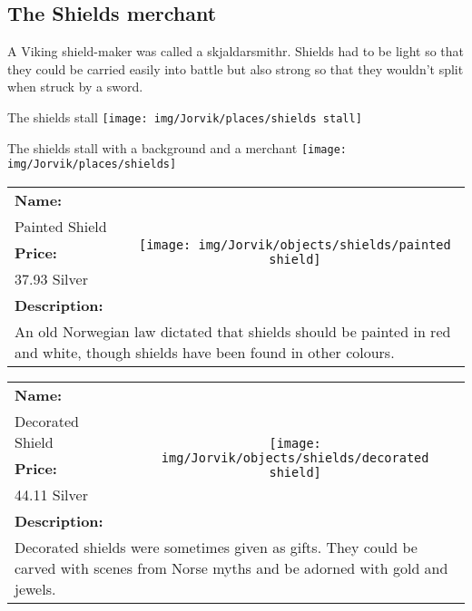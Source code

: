 

\clearpage
\subsection{The Shields merchant}
\label{sec:appendix:moj:shields}

A Viking shield-maker was called a skjaldarsmithr. Shields had to be light so that they could be carried easily into battle but also strong so that they wouldn't split when struck by a sword.

\begin{display}{The shields stall}
	\label{fig:appendix:moj:places:shields:stall}
	\texttt{[image: img/Jorvik/places/shields stall]}
\end{display}

\begin{display}{The shields stall with a background and a merchant}
	\label{fig:appendix:moj:places:shields}
	\texttt{[image: img/Jorvik/places/shields]}
\end{display}
\clearpage


\begin{table}[ht!]
	\centering
	\begin{tabular}{ p{3cm} c }\toprule
		\textbf{Name:} & \multirow{5}{*}{\texttt{[image: img/Jorvik/objects/shields/painted shield]}}\\
		Painted Shield & \\ 
		\textbf{Price:} & \\
		37.93 Silver & \\ 
		\textbf{Description:} & \\
		\multicolumn{2}{p{12cm}}{An old Norwegian law dictated that shields should be painted in red and white, though shields have been found in other colours.}\\
		\bottomrule
	\end{tabular}
\end{table}

\begin{table}[ht!]
	\centering
	\begin{tabular}{ p{3cm} c }\toprule
		\textbf{Name:} & \multirow{5}{*}{\texttt{[image: img/Jorvik/objects/shields/decorated shield]}}\\
		Decorated Shield & \\ 
		\textbf{Price:} & \\
		44.11 Silver & \\ 
		\textbf{Description:} & \\
		\multicolumn{2}{p{12cm}}{Decorated shields were sometimes given as gifts. They could be carved with scenes from Norse myths and be adorned with gold and jewels.}\\
		\bottomrule
	\end{tabular}
\end{table}

